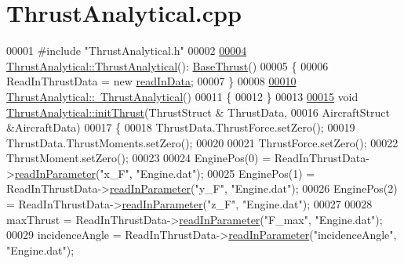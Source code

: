 \hypertarget{_thrust_analytical_8cpp_source}{}\section{Thrust\+Analytical.\+cpp}
\label{_thrust_analytical_8cpp_source}

\begin{DoxyCode}
00001 \textcolor{preprocessor}{#include "ThrustAnalytical.h"}
00002 
\hyperlink{group___engine_a5c75949a22871e861090560adb2d5f18}{00004} \hyperlink{group___engine_a5c75949a22871e861090560adb2d5f18}{ThrustAnalytical::ThrustAnalytical}():
      \hyperlink{group___engine_class_base_thrust}{BaseThrust}()
00005 \{
00006     ReadInThrustData = \textcolor{keyword}{new} \hyperlink{classread_in_data}{readInData};
00007 \}
00008 
\hyperlink{group___engine_aeaf9dd69c10812c673d6cfae0d7ca4fd}{00010} \hyperlink{group___engine_aeaf9dd69c10812c673d6cfae0d7ca4fd}{ThrustAnalytical::~ThrustAnalytical}()
00011 \{
00012 \}
00013 
\hyperlink{group___engine_a5eb762aee5e5823fa34b2236d9b21134}{00015} \textcolor{keywordtype}{void} \hyperlink{group___engine_a5eb762aee5e5823fa34b2236d9b21134}{ThrustAnalytical::initThrust}(ThrustStruct & ThrustData,
00016                                         AircraftStruct &AircraftData)
00017 \{
00018     ThrustData.ThrustForce.setZero();
00019     ThrustData.ThrustMoments.setZero();
00020     
00021     ThrustForce.setZero();
00022     ThrustMoment.setZero();
00023 
00024     EnginePos(0) = ReadInThrustData->\hyperlink{classread_in_data_a9ae979e74958b43424cb6cf4a22043d7}{readInParameter}(\textcolor{stringliteral}{"x\_F"}, \textcolor{stringliteral}{"Engine.dat"});
00025     EnginePos(1) = ReadInThrustData->\hyperlink{classread_in_data_a9ae979e74958b43424cb6cf4a22043d7}{readInParameter}(\textcolor{stringliteral}{"y\_F"}, \textcolor{stringliteral}{"Engine.dat"});
00026     EnginePos(2) = ReadInThrustData->\hyperlink{classread_in_data_a9ae979e74958b43424cb6cf4a22043d7}{readInParameter}(\textcolor{stringliteral}{"z\_F"}, \textcolor{stringliteral}{"Engine.dat"});
00027 
00028     maxThrust = ReadInThrustData->\hyperlink{classread_in_data_a9ae979e74958b43424cb6cf4a22043d7}{readInParameter}(\textcolor{stringliteral}{"F\_max"}, \textcolor{stringliteral}{"Engine.dat"});
00029     incidenceAngle = ReadInThrustData->\hyperlink{classread_in_data_a9ae979e74958b43424cb6cf4a22043d7}{readInParameter}(\textcolor{stringliteral}{"incidenceAngle"}, \textcolor{stringliteral}{"Engine.dat"});

\end{DoxyCode}
